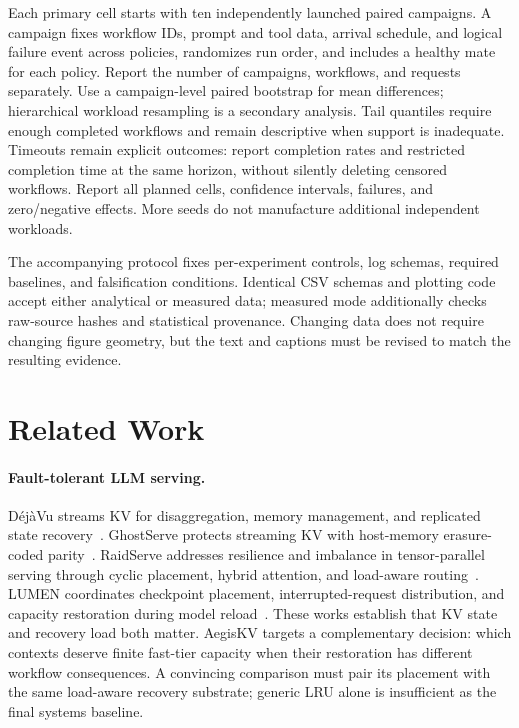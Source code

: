 \documentclass[sigplan,10pt,anonymous,nonacm]{acmart}
\begin{document}
Each primary cell starts with ten independently launched paired campaigns.
A campaign fixes workflow IDs, prompt and tool data, arrival schedule, and
logical failure event across policies, randomizes run order, and includes
a healthy mate for each policy. Report the number of campaigns, workflows,
and requests separately. Use a campaign-level paired bootstrap for mean
differences; hierarchical workload resampling is a secondary analysis.
Tail quantiles require enough completed workflows and remain descriptive
when support is inadequate. Timeouts remain explicit outcomes: report
completion rates and restricted completion time at the same horizon,
without silently deleting censored workflows. Report all planned cells,
confidence intervals, failures, and zero/negative effects. More seeds do
not manufacture additional independent workloads.

The accompanying protocol fixes per-experiment controls, log schemas,
required baselines, and falsification conditions. Identical CSV schemas
and plotting code accept either analytical or measured data; measured
mode additionally checks raw-source hashes and statistical provenance.
Changing data does not require changing figure geometry, but the text and
captions must be revised to match the resulting evidence.

\section{Related Work}
\label{sec:related}

\paragraph{Fault-tolerant LLM serving.}
D\'ej\`aVu streams KV for disaggregation, memory management, and replicated
state recovery~\cite{strati2024dejavu}. GhostServe protects streaming KV
with host-memory erasure-coded parity~\cite{jayakody2026ghostserve}.
RaidServe addresses resilience and imbalance in tensor-parallel serving
through cyclic placement, hybrid attention, and load-aware
routing~\cite{xu2026raidserve}. LUMEN coordinates checkpoint placement,
interrupted-request distribution, and capacity restoration during model
reload~\cite{cao2026lumen}. These works establish that KV state and
recovery load both matter. AegisKV targets a complementary decision:
which contexts deserve finite fast-tier capacity when their restoration
has different workflow consequences. A convincing comparison must pair
its placement with the same load-aware recovery substrate; generic LRU
alone is insufficient as the final systems baseline.
\end{document}
